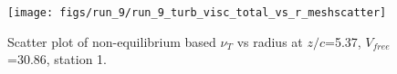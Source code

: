 \begin{figure}[H]
\centering
\texttt{[image: figs/run\_9/run\_9\_turb\_visc\_total\_vs\_r\_meshscatter]}
\caption{Scatter plot of non-equilibrium based $\nu_T$ vs radius at $z/c$=5.37, $V_{free}$=30.86, station 1.}
\label{fig:run_9_turb_visc_total_vs_r_meshscatter}
\end{figure}


